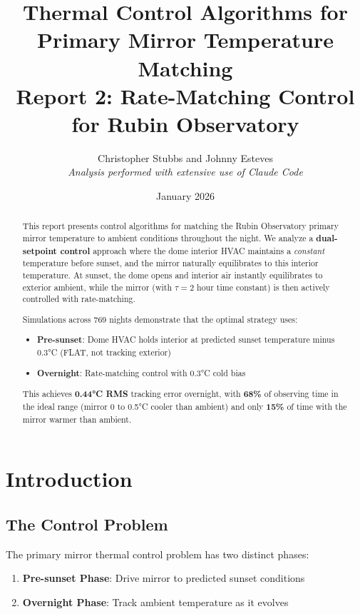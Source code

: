 \documentclass[11pt,letterpaper]{article}
\title{\textbf{Thermal Control Algorithms for\\Primary Mirror Temperature Matching}\\[0.5em]
\large Report 2: Rate-Matching Control for Rubin Observatory}
\author{Christopher Stubbs and Johnny Esteves\\[0.5em]
\small\textit{Analysis performed with extensive use of Claude Code}}
\date{January 2026}
\begin{document}
\maketitle

\begin{abstract}
This report presents control algorithms for matching the Rubin Observatory primary mirror temperature to ambient conditions throughout the night. We analyze a \textbf{dual-setpoint control} approach where the dome interior HVAC maintains a \emph{constant} temperature before sunset, and the mirror naturally equilibrates to this interior temperature. At sunset, the dome opens and interior air instantly equilibrates to exterior ambient, while the mirror (with $\tau = 2$ hour time constant) is then actively controlled with rate-matching.

Simulations across 769 nights demonstrate that the optimal strategy uses:
\begin{itemize}
    \item \textbf{Pre-sunset}: Dome HVAC holds interior at predicted sunset temperature minus 0.3°C (FLAT, not tracking exterior)
    \item \textbf{Overnight}: Rate-matching control with 0.3°C cold bias
\end{itemize}

This achieves \textbf{0.44°C RMS} tracking error overnight, with \textbf{68\%} of observing time in the ideal range (mirror 0 to 0.5°C cooler than ambient) and only \textbf{15\%} of time with the mirror warmer than ambient.
\end{abstract}

\tableofcontents

\newpage

\section{Introduction}

\subsection{The Control Problem}

The primary mirror thermal control problem has two distinct phases:

\begin{enumerate}
    \item \textbf{Pre-sunset Phase}: Drive mirror to predicted sunset conditions
    \item \textbf{Overnight Phase}: Track ambient temperature as it evolves
\end{enumerate}
\end{document}

